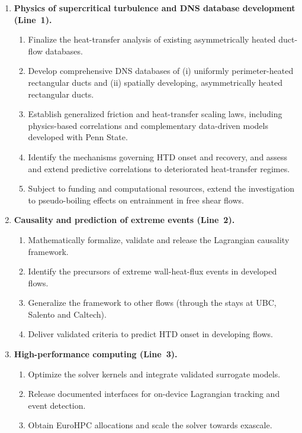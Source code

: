 \documentclass[11pt]{article}
\begin{document}
\begin{enumerate}[label=\textbf{WP\arabic*}, leftmargin=*]
	\item \textbf{Physics of supercritical turbulence and DNS database development (Line~1).}
	\begin{enumerate}[label=T1.\arabic*, leftmargin=*, nosep]
		\item Finalize the heat-transfer analysis of existing asymmetrically heated duct-flow databases.
		\item Develop comprehensive DNS databases of (i) uniformly perimeter-heated rectangular ducts and (ii) spatially developing, asymmetrically heated rectangular ducts.
		\item Establish generalized friction and heat-transfer scaling laws, including physics-based correlations and complementary data-driven models developed with Penn State.
		\item Identify the mechanisms governing HTD onset and recovery, and assess and extend predictive correlations to deteriorated heat-transfer regimes.
		\item Subject to funding and computational resources, extend the investigation to pseudo-boiling effects on entrainment in free shear flows.
	\end{enumerate}
  \item \textbf{Causality and prediction of extreme events (Line~2).}
  \begin{enumerate}[label=T2.\arabic*, leftmargin=*, nosep]
    \item Mathematically formalize, validate and release the Lagrangian causality framework.
    \item Identify the precursors of extreme wall-heat-flux events in developed flows.
    \item Generalize the framework to other flows (through the stays at UBC, Salento and Caltech).
    \item Deliver validated criteria to predict HTD onset in developing flows.
  \end{enumerate}
  \item \textbf{High-performance computing (Line~3).}
  \begin{enumerate}[label=T3.\arabic*, leftmargin=*, nosep]
    \item Optimize the solver kernels and integrate validated surrogate models.
    \item Release documented interfaces for on-device Lagrangian tracking and event detection.
    \item Obtain EuroHPC allocations and scale the solver towards exascale.

\end{enumerate}
\end{enumerate}
\end{document}
